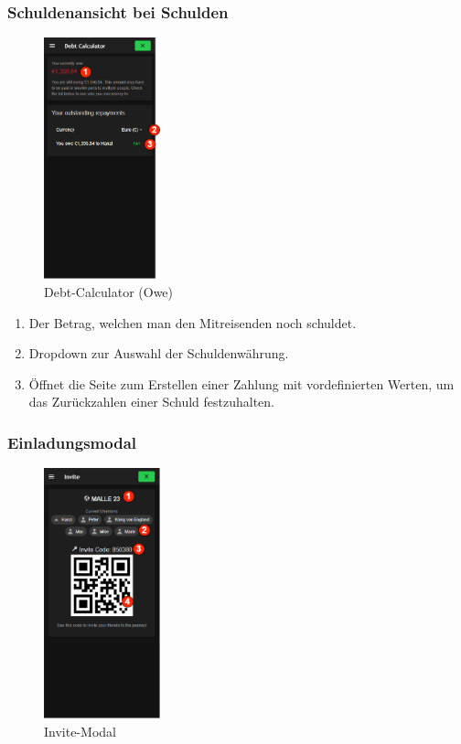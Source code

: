 \subsubsection{Schuldenansicht bei Schulden}\label{debt-calculator_(owe)}
\begin{figure}[H]
	\centering
	\includegraphics[width=0.3\textwidth]{img/pages_numbers/debt-calculator_(owe).drawio}
	\caption[Debt-Calculator (Owe)]{Debt-Calculator (Owe)}
	\label{fig:debt-calculator_(owe)}
\end{figure}
\begin{enumerate}[label=\protect\circled{\arabic*}]
	\item Der Betrag, welchen man den Mitreisenden noch schuldet.
	\item Dropdown zur Auswahl der Schuldenwährung.
	\item Öffnet die Seite zum Erstellen einer Zahlung mit vordefinierten Werten, um das Zurückzahlen einer Schuld festzuhalten.
\end{enumerate}

\subsubsection{Einladungsmodal}\label{invite-modal}
\begin{figure}[H]
	\centering
	\includegraphics[width=0.3\textwidth]{img/pages_numbers/invite-modal.drawio}
	\caption[Invite-Modal]{Invite-Modal}
	\label{fig:invite-modal}
\end{figure}

